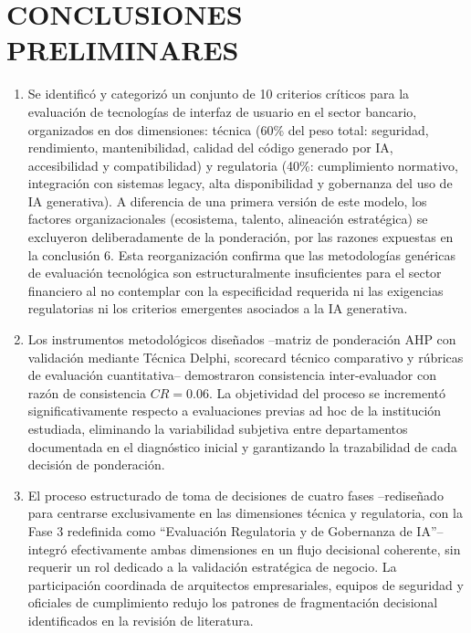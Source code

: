 \chapter*{CONCLUSIONES PRELIMINARES}

\begin{enumerate}
  \item Se identificó y categorizó un conjunto de 10 criterios críticos para
        la evaluación de tecnologías de interfaz de usuario en el sector
        bancario, organizados en dos dimensiones: técnica (60\% del peso
        total: seguridad, rendimiento, mantenibilidad, calidad del código
        generado por IA, accesibilidad y compatibilidad) y regulatoria
        (40\%: cumplimiento normativo, integración con sistemas legacy,
        alta disponibilidad y gobernanza del uso de IA generativa). A
        diferencia de una primera versión de este modelo, los factores
        organizacionales (ecosistema, talento, alineación estratégica) se
        excluyeron deliberadamente de la ponderación, por las razones
        expuestas en la conclusión 6. Esta reorganización confirma que las
        metodologías genéricas de evaluación tecnológica son
        estructuralmente insuficientes para el sector financiero al no
        contemplar con la especificidad requerida ni las exigencias
        regulatorias ni los criterios emergentes asociados a la IA
        generativa.

  \item Los instrumentos metodológicos diseñados --matriz de ponderación AHP
        con validación mediante Técnica Delphi, scorecard técnico comparativo
        y rúbricas de evaluación cuantitativa-- demostraron consistencia
        inter-evaluador con razón de consistencia $CR = 0.06$. La
        objetividad del proceso se incrementó significativamente respecto a
        evaluaciones previas ad hoc de la institución estudiada, eliminando
        la variabilidad subjetiva entre departamentos documentada en el
        diagnóstico inicial y garantizando la trazabilidad de cada decisión
        de ponderación.

  \item El proceso estructurado de toma de decisiones de cuatro fases
        --rediseñado para centrarse exclusivamente en las dimensiones
        técnica y regulatoria, con la Fase 3 redefinida como
        ``Evaluación Regulatoria y de Gobernanza de IA''-- integró
        efectivamente ambas dimensiones en un flujo decisional coherente,
        sin requerir un rol dedicado a la validación estratégica de
        negocio. La participación coordinada de arquitectos empresariales,
        equipos de seguridad y oficiales de cumplimiento redujo los
        patrones de fragmentación decisional identificados en la revisión
        de literatura.


\end{enumerate}

